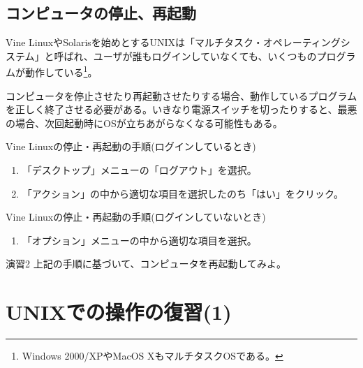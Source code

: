 \documentclass[a4j,10pt]{jarticle}
\begin{document}
\subsection{コンピュータの停止、再起動}
Vine LinuxやSolarisを始めとするUNIXは「マルチタスク・オペレーティングシ
ステム」と呼ばれ、ユーザが誰もログインしていなくても、いくつものプログラ
ムが動作している\footnote{Windows 2000/XPやMacOS XもマルチタスクOSである。}。

コンピュータを停止させたり再起動させたりする場合、動作しているプログラム
を正しく終了させる必要がある。いきなり電源スイッチを切ったりすると、最悪
の場合、次回起動時にOSが立ちあがらなくなる可能性もある。

\begin{screen}
 Vine Linuxの停止・再起動の手順(ログインしているとき)
 \begin{enumerate}
  \item 「デスクトップ」メニューの「ログアウト」を選択。
  \item 「アクション」の中から適切な項目を選択したのち「はい」をクリック。
 \end{enumerate}
 Vine Linuxの停止・再起動の手順(ログインしていないとき)
 \begin{enumerate}
  \item 「オプション」メニューの中から適切な項目を選択。
 \end{enumerate}
\end{screen}
\begin{itembox}{演習2}
 上記の手順に基づいて、コンピュータを再起動してみよ。
\end{itembox}

\section{UNIXでの操作の復習(1)}
\end{document}
